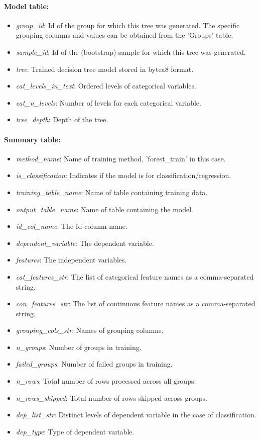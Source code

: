 \paragraph{Model table:}

\begin{itemize}
    \item \emph{group\_id}: Id of the group for which this tree was generated. The specific
    grouping columns and values can be obtained from the 'Groups' table.
    \item \emph{sample\_id}: Id of the (bootstrap) sample for which this tree was generated.
    \item \emph{tree}: Trained decision tree model stored in bytea8 format.
    \item \emph{cat\_levels\_in\_text}: Ordered levels of categorical variables.
    \item \emph{cat\_n\_levels}: Number of levels for each categorical variable.
    \item \emph{tree\_depth}: Depth of the tree.
\end{itemize}

\paragraph{Summary table:}

\begin{itemize}
    \item \emph{method\_name}: Name of training method, 'forest\_train' in this case.
    \item \emph{is\_classification}: Indicates if the model is for classification/regression.
    \item \emph{training\_table\_name}: Name of table containing training data.
    \item \emph{output\_table\_name}: Name of table containing the model.
    \item \emph{id\_col\_name}: The Id column name.
    \item \emph{dependent\_variable}: The dependent variable.
    \item \emph{features}: The independent variables.
    \item \emph{cat\_features\_str}: The list of categorical feature names as a comma-separated string.
    \item \emph{con\_features\_str}: The list of continuous feature names as a comma-separated string.
    \item \emph{grouping\_cols\_str}: Names of grouping columns.
    \item \emph{n\_groups}: Number of groups in training.
    \item \emph{failed\_groups}: Number of failed groups in training.
    \item \emph{n\_rows}: Total number of rows processed across all groups.
    \item \emph{n\_rows\_skipped}: Total number of rows skipped across groups.
    \item \emph{dep\_list\_str}: Distinct levels of dependent variable in the case of classification.
    \item \emph{dep\_type}: Type of dependent variable.
\end{itemize}

